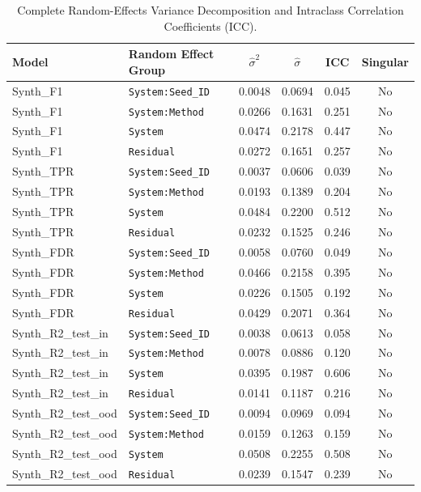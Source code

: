 \begin{table}[t]
\centering
\caption{Complete Random-Effects Variance Decomposition and Intraclass Correlation Coefficients (ICC).}
\label{tab:mixed_effects_icc}
\scriptsize
\setlength{\tabcolsep}{3.5pt}
\begin{tabular}{llcccc}
\toprule
Model & Random Effect Group & $\hat{\sigma}^2$ & $\hat{\sigma}$ & ICC & Singular \\
\midrule
Synth\_F1 & \texttt{System:Seed\_ID} & 0.0048 & 0.0694 & 0.045 & No \\
Synth\_F1 & \texttt{System:Method} & 0.0266 & 0.1631 & 0.251 & No \\
Synth\_F1 & \texttt{System} & 0.0474 & 0.2178 & 0.447 & No \\
Synth\_F1 & \texttt{Residual} & 0.0272 & 0.1651 & 0.257 & No \\
\midrule
Synth\_TPR & \texttt{System:Seed\_ID} & 0.0037 & 0.0606 & 0.039 & No \\
Synth\_TPR & \texttt{System:Method} & 0.0193 & 0.1389 & 0.204 & No \\
Synth\_TPR & \texttt{System} & 0.0484 & 0.2200 & 0.512 & No \\
Synth\_TPR & \texttt{Residual} & 0.0232 & 0.1525 & 0.246 & No \\
\midrule
Synth\_FDR & \texttt{System:Seed\_ID} & 0.0058 & 0.0760 & 0.049 & No \\
Synth\_FDR & \texttt{System:Method} & 0.0466 & 0.2158 & 0.395 & No \\
Synth\_FDR & \texttt{System} & 0.0226 & 0.1505 & 0.192 & No \\
Synth\_FDR & \texttt{Residual} & 0.0429 & 0.2071 & 0.364 & No \\
\midrule
Synth\_R2\_test\_in & \texttt{System:Seed\_ID} & 0.0038 & 0.0613 & 0.058 & No \\
Synth\_R2\_test\_in & \texttt{System:Method} & 0.0078 & 0.0886 & 0.120 & No \\
Synth\_R2\_test\_in & \texttt{System} & 0.0395 & 0.1987 & 0.606 & No \\
Synth\_R2\_test\_in & \texttt{Residual} & 0.0141 & 0.1187 & 0.216 & No \\
\midrule
Synth\_R2\_test\_ood & \texttt{System:Seed\_ID} & 0.0094 & 0.0969 & 0.094 & No \\
Synth\_R2\_test\_ood & \texttt{System:Method} & 0.0159 & 0.1263 & 0.159 & No \\
Synth\_R2\_test\_ood & \texttt{System} & 0.0508 & 0.2255 & 0.508 & No \\
Synth\_R2\_test\_ood & \texttt{Residual} & 0.0239 & 0.1547 & 0.239 & No \\

\end{tabular}
\end{table}
